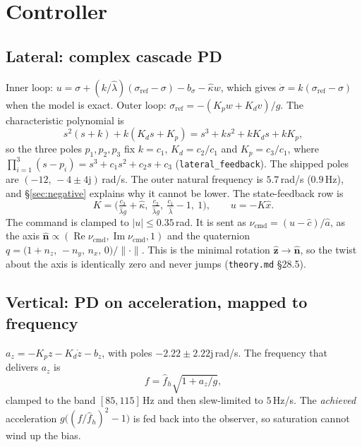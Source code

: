 \documentclass[11pt]{article}
\newcommand{\uv}[1]{\hat{\mathbf{#1}}}
\newcommand{\jj}{\mathrm{j}}
\renewcommand{\Re}{\operatorname{Re}}
\renewcommand{\Im}{\operatorname{Im}}
\newcommand{\norm}[1]{\lVert #1 \rVert}
\begin{document}
\section{Controller}
\label{sec:controller}

\subsection{Lateral: complex cascade PD}
Inner loop: $u=\sigma+(k/\hat\lambda)(\sigma_{\mathrm{ref}}-\sigma)-b_\sigma-\hat\kappa w$, which gives
$\dot\sigma=k(\sigma_{\mathrm{ref}}-\sigma)$ when the model is exact. Outer loop:
$\sigma_{\mathrm{ref}}=-(K_p w+K_d v)/g$. The characteristic polynomial is
\[
s^2(s+k)+k(K_d s+K_p)=s^3+k s^2+kK_d s+kK_p ,
\]
so the three poles $p_1,p_2,p_3$ fix $k=c_1$, $K_d=c_2/c_1$ and $K_p=c_3/c_1$, where
$\prod_{i=1}^{3}(s-p_i)=s^3+c_1s^2+c_2s+c_3$ (\texttt{lateral\_feedback}). The shipped poles are
$(-12,\,-4\pm4\jj)$\,rad/s. The outer natural frequency is $5.7$\,rad/s ($0.9$\,Hz), and
\S\ref{sec:negative} explains why it cannot be lower. The state-feedback row is
\[
K=\Big(\tfrac{c_3}{\hat\lambda g}+\hat\kappa,\ \tfrac{c_2}{\hat\lambda g},\ \tfrac{c_1}{\hat\lambda}-1,\ 1\Big),\qquad u=-K\hat x .
\]
The command is clamped to $|u|\le0.35$\,rad. It is sent as
$\nu_{\mathrm{cmd}}=(u-\hat c)/\hat a$, as the axis $\uv n\propto(\Re\nu_{\mathrm{cmd}},\Im\nu_{\mathrm{cmd}},1)$
and the quaternion $q=\big(1+n_z,\,-n_y,\,n_x,\,0\big)/\norm{\cdot}$. This is the minimal rotation
$\uv z\to\uv n$, so the twist about the axis is identically zero and never jumps (\texttt{theory.md}
\S28.5).

\subsection{Vertical: PD on acceleration, mapped to frequency}
$a_z=-K_pz-K_d\dot z-b_z$, with poles $-2.22\pm2.22\jj$\,rad/s. The frequency that delivers $a_z$ is
\[
f=\hat f_h\sqrt{1+a_z/g},
\]
clamped to the band $[85,115]$\,Hz and then slew-limited to $5$\,Hz/s. The \emph{achieved}
acceleration $g\big((f/\hat f_h)^2-1\big)$ is fed back into the observer, so saturation cannot wind
up the bias.
\end{document}
